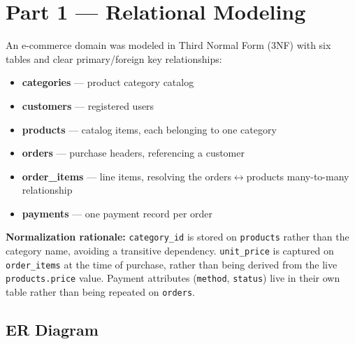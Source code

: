 \documentclass[11pt]{article}
\begin{document}
\section{Part 1 --- Relational Modeling}

An e-commerce domain was modeled in Third Normal Form (3NF) with six
tables and clear primary/foreign key relationships:

\begin{itemize}
    \item \textbf{categories} --- product category catalog
    \item \textbf{customers} --- registered users
    \item \textbf{products} --- catalog items, each belonging to one category
    \item \textbf{orders} --- purchase headers, referencing a customer
    \item \textbf{order\_items} --- line items, resolving the orders$\leftrightarrow$products
          many-to-many relationship
    \item \textbf{payments} --- one payment record per order
\end{itemize}

\textbf{Normalization rationale:} \texttt{category\_id} is stored on
\texttt{products} rather than the category name, avoiding a transitive
dependency. \texttt{unit\_price} is captured on \texttt{order\_items} at
the time of purchase, rather than being derived from the live
\texttt{products.price} value. Payment attributes (\texttt{method},
\texttt{status}) live in their own table rather than being repeated on
\texttt{orders}.

\subsection*{ER Diagram}
\end{document}
